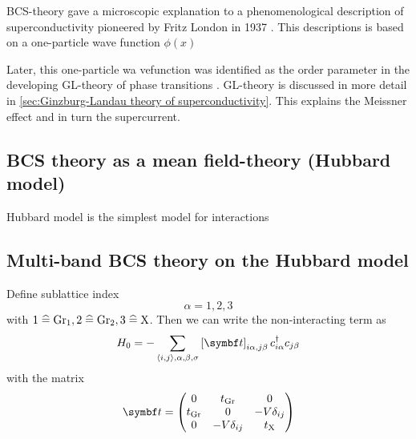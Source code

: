 \documentclass[../notes.tex]{subfiles}
\begin{document}
BCS-theory gave a microscopic explanation to a phenomenological description of superconductivity pioneered by Fritz London in 1937 \cite{londonNewConceptionSupraconductivity1937}.
This descriptions is based on a one-particle wave function \(\phi (x)\)

Later, this one-particle wa
vefunction was identified as the order parameter in the developing GL-theory of phase transitions \cite{landauTheorySuperconductivity1965}.
GL-theory is discussed in more detail in \cref{sec:Ginzburg-Landau theory of superconductivity}.
This explains the Meissner effect and in turn the supercurrent.

\subsection{BCS theory as a mean field-theory (Hubbard model)}

Hubbard model is the simplest model for interactions

\cite{qinHubbardModelComputational2022}



\cite{micnasSuperconductivityNarrowbandSystems1990}




\subsection{Multi-band BCS theory on the Hubbard model}


Define sublattice index
\begin{equation}
	\alpha = 1, 2, 3
\end{equation}
with \(1 \mathrel{\widehat{=}} \mathrm{Gr}_1, 2 \mathrel{\widehat{=}} \mathrm{Gr}_2, 3 \mathrel{\widehat{=}} \mathrm{X}\).
Then we can write the non-interacting term as
\begin{equation}
	H_0 = - \sum_{\langle i, j \rangle, \alpha, \beta, \sigma} \left[\mat{t} \right]_{i\alpha,j\beta} c_{i\alpha}^{\dagger} c_{j\beta}
\end{equation}
with the matrix
\begin{equation}
	\mat{t} = \begin{pmatrix}
		0 & t_{\mathrm{Gr}} & 0 \\
		t_{\mathrm{Gr}} & 0 & -V \delta_{ij} \\
		0 & -V \delta_{ij} & t_{\mathrm{X}} \\
	\end{pmatrix}
\end{equation}
\end{document}
